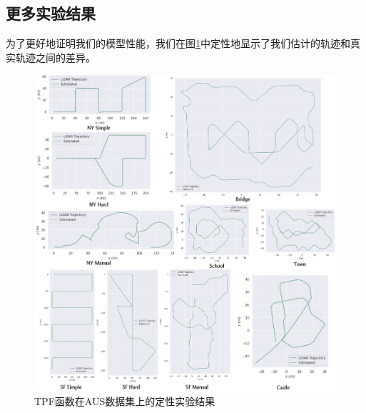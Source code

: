 %
%
%
%
%
%

\begin{appendices}
\section{更多实验结果}


为了更好地证明我们的模型性能，我们在图\ref{fig:supp-time-pose-function-qualitative}中定性地显示了我们估计的轨迹和真实轨迹之间的差异。

\begin{figure}[p]
    \centering
    \includegraphics[width=\textwidth]{undergraduate-thesis/images/time-pose function/evo.pdf}
    \caption{TPF函数在AUS数据集上的定性实验结果}
    \label{fig:supp-time-pose-function-qualitative}
\end{figure}


\end{appendices}
